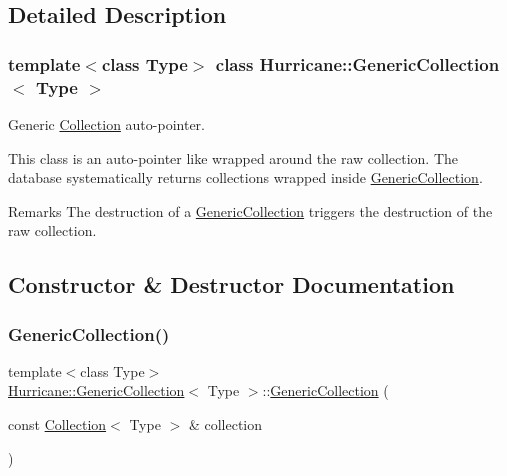 \subsection{Detailed Description}
\subsubsection*{template$<$class Type$>$\newline
class Hurricane\+::\+Generic\+Collection$<$ Type $>$}

Generic \mbox{\hyperlink{classHurricane_1_1Collection}{Collection}} auto-\/pointer. 

This class is an auto-\/pointer like wrapped around the raw collection. The database systematically returns collections wrapped inside \mbox{\hyperlink{classHurricane_1_1GenericCollection}{Generic\+Collection}}.

\begin{DoxyRemark}{Remarks}
The destruction of a \mbox{\hyperlink{classHurricane_1_1GenericCollection}{Generic\+Collection}} triggers the destruction of the raw collection. 
\end{DoxyRemark}


\subsection{Constructor \& Destructor Documentation}
\mbox{\label{classHurricane_1_1GenericCollection_a177ca321f1b7761c8b000a59051ba9f9}} 
\subsubsection{\texorpdfstring{Generic\+Collection()}{GenericCollection()}\hspace{0.1cm}{\footnotesize\ttfamily [1/3]}}
{\footnotesize\ttfamily template$<$class Type$>$ \\
\mbox{\hyperlink{classHurricane_1_1GenericCollection}{Hurricane\+::\+Generic\+Collection}}$<$ Type $>$\+::\mbox{\hyperlink{classHurricane_1_1GenericCollection}{Generic\+Collection}} (\begin{DoxyParamCaption}\item[{const \mbox{\hyperlink{classHurricane_1_1Collection}{Collection}}$<$ Type $>$ \&}]{collection }\end{DoxyParamCaption})\hspace{0.3cm}{\ttfamily [inline]}}

